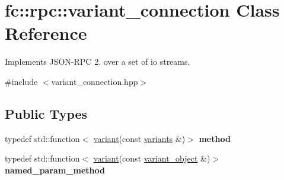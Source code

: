 \hypertarget{classfc_1_1rpc_1_1variant__connection}{}\section{fc\+:\+:rpc\+:\+:variant\+\_\+connection Class Reference}
\label{classfc_1_1rpc_1_1variant__connection}


Implements J\+S\+O\+N-\/\+R\+PC 2. over a set of io streams.  




{\ttfamily \#include $<$variant\+\_\+connection.\+hpp$>$}

\subsection*{Public Types}
\begin{DoxyCompactItemize}
\item 
\mbox{\label{classfc_1_1rpc_1_1variant__connection_a23fcfe22a8fd75815a78319e8cc42d7b}} 
typedef std\+::function$<$ \mbox{\hyperlink{classfc_1_1variant}{variant}}(const \mbox{\hyperlink{classstd_1_1vector}{variants}} \&)$>$ {\bfseries method}
\item 
\mbox{\label{classfc_1_1rpc_1_1variant__connection_ad3ecbaf97c671771db9d2a0e65f12a77}} 
typedef std\+::function$<$ \mbox{\hyperlink{classfc_1_1variant}{variant}}(const \mbox{\hyperlink{classfc_1_1variant__object}{variant\+\_\+object}} \&)$>$ {\bfseries named\+\_\+param\+\_\+method}
\end{DoxyCompactItemize}
